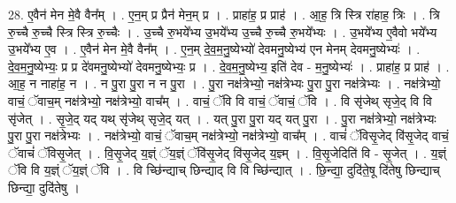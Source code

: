 \documentclass[17pt]{extarticle}
\begin{document}
28. ए॒वैन॑ मेन मे॒वै वैन᳚म् । . ए॒न॒म् प्र प्रैन॑ मेन॒म् प्र । . प्राहा॑ह॒ प्र प्राह॑ । . आ॒ह॒ त्रि स्त्रि रा॑हाह॒ त्रिः । . त्रि रु॒च्चै रु॒च्चै स्त्रि स्त्रि रु॒च्चैः । . उ॒च्चै रु॒भये᳚भ्य उ॒भये᳚भ्य उ॒च्चै रु॒च्चै रु॒भये᳚भ्यः । . उ॒भये᳚भ्य ए॒वैवो भये᳚भ्य उ॒भये᳚भ्य ए॒व । . ए॒वैन॑ मेन मे॒वै वैन᳚म् । . ए॒न॒म् दे॒व॒म॒नु॒ष्येभ्यो॑ देवमनु॒ष्येभ्य॑ एन मेनम् देवमनु॒ष्येभ्यः॑ । . दे॒व॒म॒नु॒ष्येभ्यः॒ प्र प्र दे॑वमनु॒ष्येभ्यो॑ देवमनु॒ष्येभ्यः॒ प्र । . दे॒व॒म॒नु॒ष्येभ्य॒ इति॑ देव - म॒नु॒ष्येभ्यः॑ । . प्राहा॑ह॒ प्र प्राह॑ । . आ॒ह॒ न नाहा॑ह॒ न । . न पु॒रा पु॒रा न न पु॒रा । . पु॒रा नक्ष॑त्रेभ्यो॒ नक्ष॑त्रेभ्यः पु॒रा पु॒रा नक्ष॑त्रेभ्यः । . नक्ष॑त्रेभ्यो॒ वाचं॒ ॅवाच॒म् नक्ष॑त्रेभ्यो॒ नक्ष॑त्रेभ्यो॒ वाच᳚म् । . वाचं॒ ॅवि वि वाचं॒ ॅवाचं॒ ॅवि । . वि सृ॑जेथ् सृजे॒द् वि वि सृ॑जेत् । . सृ॒जे॒द् यद् यथ् सृ॑जेथ् सृजे॒द् यत् । . यत् पु॒रा पु॒रा यद् यत् पु॒रा । . पु॒रा नक्ष॑त्रेभ्यो॒ नक्ष॑त्रेभ्यः पु॒रा पु॒रा नक्ष॑त्रेभ्यः । . नक्ष॑त्रेभ्यो॒ वाचं॒ ॅवाच॒म् नक्ष॑त्रेभ्यो॒ नक्ष॑त्रेभ्यो॒ वाच᳚म् । . वाचं॑ ॅविसृ॒जेद् वि॑सृ॒जेद् वाचं॒ ॅवाचं॑ ॅविसृ॒जेत् । . वि॒सृ॒जेद् य॒ज्ञ्ं ॅय॒ज्ञ्ं ॅवि॑सृ॒जेद् वि॑सृ॒जेद् य॒ज्ञ्म् । . वि॒सृ॒जेदिति॑ वि - सृ॒जेत् । . य॒ज्ञ्ं ॅवि वि य॒ज्ञ्ं ॅय॒ज्ञ्ं ॅवि । . वि च्छि॑न्द्याच् छिन्द्याद् वि वि च्छि॑न्द्यात् । . छि॒न्द्या॒ दुदि॑ते॒षू दि॑तेषु छिन्द्याच् छिन्द्या॒ दुदि॑तेषु । \newline
\end{document}
